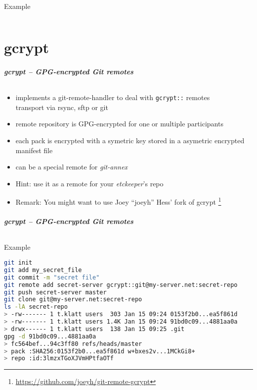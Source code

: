 \documentclass[english,hyperref={pdfpagelabels=false},aspectratio=169]{beamer}
\begin{document}
\begin{frame}[fragile]
  \frametitle{}
  \begin{block}{Example}
    \vspace{-0.75em}
    \begin{lstlisting}

    \end{lstlisting}
    \vspace{-0.75em}
  \end{block}
\end{frame}


\part{gcrypt}
\makepart

\begin{frame}[label=gcrypt]
  \frametitle{gcrypt -- GPG-encrypted Git remotes}
  \framesubtitle{}
  \begin{itemize}
    \item implements a git-remote-handler to deal with \texttt{gcrypt::} remotes\\
      {\scriptsize transport via rsync, sftp or git}
    \item remote repository is GPG-encrypted for one or multiple participants
    \item each pack is encrypted with a symetric key stored in a asymetric encrypted manifest file
    \item can be a special remote for \textit{git-annex}
    \item Hint: use it as a remote for your \textit{etckeeper}'s repo
    \item Remark: You might want to use Joey ``joeyh'' Hess' fork of gcrypt
      \footnote{\tiny\url{https://github.com/joeyh/git-remote-gcrypt}}
  \end{itemize}
\end{frame}

\begin{frame}[fragile]
  \frametitle{gcrypt -- GPG-encrypted Git remotes}
  \framesubtitle{}
  \begin{block}{Example}
    \vspace{-0.75em}
    \begin{lstlisting}[language=zsh]
git init
git add my_secret_file
git commit -m "secret file"
git remote add secret-server gcrypt::git@my-server.net:secret-repo
git push secret-server master
git clone git@my-server.net:secret-repo
ls -lA secret-repo
> -rw------- 1 t.klatt users  303 Jan 15 09:24 0153f2b0...ea5f861d
> -rw------- 1 t.klatt users 1.4K Jan 15 09:24 91bd0c09...4881aa0a
> drwx------ 1 t.klatt users  138 Jan 15 09:25 .git
gpg -d 91bd0c09...4881aa0a
> fc564bef...94c3ff80 refs/heads/master
> pack :SHA256:0153f2b0...ea5f861d w+bxes2v...1MCkGi8+
> repo :id:3lmzxTGoXJVmHPtfaOTf
    \end{lstlisting}
    \vspace{-0.75em}
  \end{block}
\end{frame}
\end{document}
